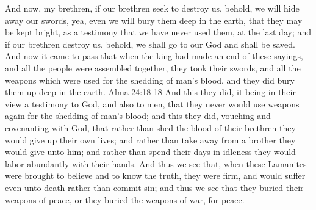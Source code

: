 And now, my brethren, if our brethren seek to destroy us, behold, we will hide away our swords, yea, even we will bury them deep in the earth, that they may be kept bright, as a testimony that we have never used them, at the last day; and if our brethren destroy us, behold, we shall go to our God and shall be saved.
\bverse \iffalse And now it came to pass that when the king had made an end of these sayings, and all the people were assembled together, they took their swords, and all the weapons which were used for the shedding of man's blood, and they did bury them up deep in the earth.  Alma 24:18 18 And this they did, it being in their view a testimony to God, and also to men, that they never would use weapons again for the shedding of man's blood; and this they did, vouching and covenanting with God, that rather than shed the blood of their brethren they would give up their own lives; and rather than take away from a brother they would give unto him; and rather than spend their days in idleness they would labor abundantly with their hands. \fi
And now it came to pass that when the king had made an end of these sayings, and all the people were assembled together, they took their swords, and all the weapons which were used for the shedding of man's blood, and they did bury them up deep in the earth.  Alma 24:18 18 And this they did, it being in their view a testimony to God, and also to men, that they never would use weapons again for the shedding of man's blood; and this they did, vouching and covenanting with God, that rather than shed the blood of their brethren they would give up their own lives; and rather than take away from a brother they would give unto him; and rather than spend their days in idleness they would labor abundantly with their hands.
\bverse \iffalse And thus we see that, when these Lamanites were brought to believe and to know the truth, they were firm, and would suffer even unto death rather than commit sin; and thus we see that they buried their weapons of peace, or they buried the weapons of war, for peace. \fi
And thus we see that, when these Lamanites were brought to believe and to know the truth, they were firm, and would suffer even unto death rather than commit sin; and thus we see that they buried their weapons of peace, or they buried the weapons of war, for peace.
\bverse \iffalse And it came to pass that their brethren, the Lamanites, made preparations for war, and came up to the land of Nephi for the purpose of destroying the king, and to place another in his stead, and also of destroying the people of Anti-Nephi-Lehi out of the land. \fi
